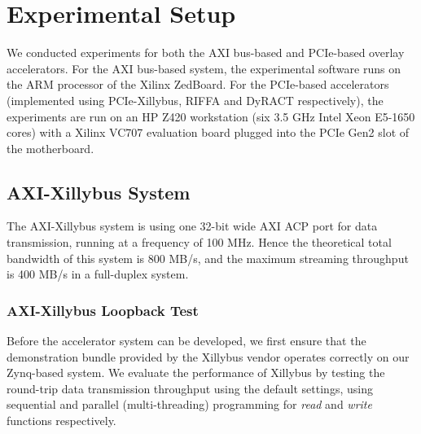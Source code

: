 \section{Experimental Setup}
We conducted experiments for both the AXI bus-based and PCIe-based overlay accelerators.  
For the AXI bus-based system, the experimental software runs on the ARM processor of the Xilinx ZedBoard. 
For the PCIe-based accelerators (implemented using PCIe-Xillybus, RIFFA and DyRACT respectively), the experiments are run on an HP Z420 workstation (six 3.5 GHz Intel Xeon E5-1650 cores) with a Xilinx VC707 evaluation board plugged into the PCIe Gen2 slot of the motherboard. 

\subsection{AXI-Xillybus System}
The AXI-Xillybus system is using one 32-bit wide AXI ACP port for data transmission, running at a frequency of 100 MHz. 
Hence the theoretical total bandwidth of this system is 800 MB/s, and the maximum streaming throughput is 400 MB/s in a full-duplex system. 

\subsubsection{AXI-Xillybus Loopback Test}
Before the accelerator system can be developed, we first ensure that the demonstration bundle provided by the Xillybus vendor operates correctly on our Zynq-based system. 
We evaluate the performance of Xillybus by testing the round-trip data transmission throughput using the default settings, using sequential and parallel (multi-threading) programming for \textit{read} and \textit{write} functions respectively. 

